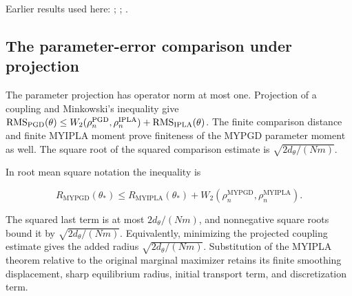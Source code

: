 \documentclass[11pt,a4paper]{report}
\begin{document}
Earlier results used here: \cite[Section~3.17.3]{LangevinLean2026ULASC}; \cite[Section~3.17.4]{LangevinLean2026ULASC}; \cite[Section~3.1.1]{LangevinLean2026IPLA}.
\subsection{\texorpdfstring{The parameter-error comparison under projection}{The parameter-error comparison under projection}}
\label{report-step-ProximalLangevin-MYPGDTheorem-lean-2}


The parameter projection has operator norm at most one. Projection of a coupling and Minkowski’s inequality give \(\operatorname{RMS}_{\rm PGD}(\theta)\le W_2(\rho_n^{\rm PGD},\rho_n^{\rm IPLA})+\operatorname{RMS}_{\rm IPLA}(\theta)\). The finite comparison distance and finite MYIPLA moment prove finiteness of the MYPGD parameter moment as well. The square root of the squared comparison estimate is \(\sqrt{2d_\theta/(Nm)}\).



In root mean square notation the inequality is

\[R_{\mathrm{MYPGD}}(\theta_*)\le R_{\mathrm{MYIPLA}}(\theta_*)+W_2(\rho_n^{\mathrm{MYPGD}},\rho_n^{\mathrm{MYIPLA}}).\]

The squared last term is at most \(2d_\theta/(Nm)\), and nonnegative square roots bound it by \(\sqrt{2d_\theta/(Nm)}\). Equivalently, minimizing the projected coupling estimate gives the added radius \(\sqrt{2d_\theta/(Nm)}\). Substitution of the MYIPLA theorem relative to the original marginal maximizer retains its finite smoothing displacement, sharp equilibrium radius, initial transport term, and discretization term.
\end{document}
